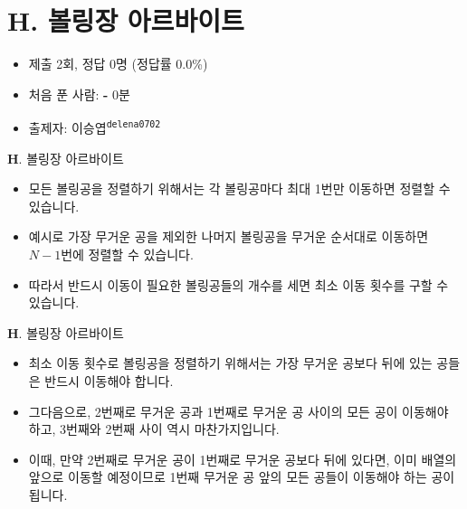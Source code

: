 \section{H. 볼링장 아르바이트}

\begin{frame} %
    \begin{itemize}
    	\item 제출 2회, 정답 0명 (정답률 0.0\%)
    	\item 처음 푼 사람: \textbf{-} 0분
        \item 출제자: 이승엽\textsuperscript{\color{kupc-gray}\texttt{delena0702}}
    \end{itemize}
\end{frame}

\begin{frame}{\textbf{H}. 볼링장 아르바이트}
	\begin{itemize}
		\item 모든 볼링공을 정렬하기 위해서는 각 볼링공마다 최대 1번만 이동하면 정렬할 수 있습니다.
		\item 예시로 가장 무거운 공을 제외한 나머지 볼링공을 무거운 순서대로 이동하면 $N - 1$번에 정렬할 수 있습니다.
		\item 따라서 반드시 이동이 필요한 볼링공들의 개수를 세면 최소 이동 횟수를 구할 수 있습니다.
	\end{itemize}
\end{frame}

\begin{frame}{\textbf{H}. 볼링장 아르바이트}	
	\begin{itemize}
		\item 최소 이동 횟수로 볼링공을 정렬하기 위해서는 가장 무거운 공보다 뒤에 있는 공들은 반드시 이동해야 합니다.
		\item 그다음으로, 2번째로 무거운 공과 1번째로 무거운 공 사이의 모든 공이 이동해야 하고, 3번째와 2번째 사이 역시 마찬가지입니다.
		\item 이때, 만약 2번째로 무거운 공이 1번째로 무거운 공보다 뒤에 있다면, 이미 배열의 앞으로 이동할 예정이므로 1번째 무거운 공 앞의 모든 공들이 이동해야 하는 공이 됩니다.
	\end{itemize}
\end{frame}

